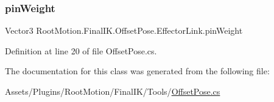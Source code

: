 \mbox{\label{class_root_motion_1_1_final_i_k_1_1_offset_pose_1_1_effector_link_a349fac619206531a83a9e51393da3b6c}} 
\subsubsection{\texorpdfstring{pin\+Weight}{pinWeight}}
{\footnotesize\ttfamily Vector3 Root\+Motion.\+Final\+I\+K.\+Offset\+Pose.\+Effector\+Link.\+pin\+Weight}



Definition at line 20 of file Offset\+Pose.\+cs.



The documentation for this class was generated from the following file\+:\begin{DoxyCompactItemize}
\item 
Assets/\+Plugins/\+Root\+Motion/\+Final\+I\+K/\+Tools/\mbox{\hyperlink{_offset_pose_8cs}{Offset\+Pose.\+cs}}\end{DoxyCompactItemize}
